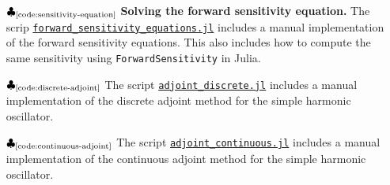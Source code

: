 \begin{itemize}
    \item[$\clubsuit_\text{\ref{code:sensitivity-equation}}$] \textbf{Solving the forward sensitivity equation. } The scrip \href{https://github.com/ODINN-SciML/DiffEqSensitivity-Review/blob/main/code/SolverMethods/Harmonic/forward_sensitivity_equations.jl}{\texttt{forward\_sensitivity\_equations.jl}} includes a manual implementation of the  forward sensitivity equations. This also includes how to compute the same sensitivity using \texttt{ForwardSensitivity} in Julia. 
    
    \item[$\clubsuit_\text{\ref{code:discrete-adjoint}}$] The script \href{https://github.com/ODINN-SciML/DiffEqSensitivity-Review/blob/main/code/SolverMethods/Harmonic/adjoint_discrete.jl}{\texttt{adjoint\_discrete.jl}} includes a manual implementation of the discrete adjoint method for the simple harmonic oscillator. 
    
    \item[$\clubsuit_\text{\ref{code:continuous-adjoint}}$] The script \href{https://github.com/ODINN-SciML/DiffEqSensitivity-Review/blob/main/code/SolverMethods/Harmonic/adjoint_continuous.jl}{\texttt{adjoint\_continuous.jl}} includes a manual implementation of the continuous adjoint method for the simple harmonic oscillator. 
\end{itemize}